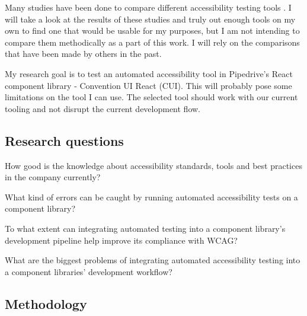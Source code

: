 \documentclass{master_thesis}
\begin{document}
Many studies have been done to compare different accessibility testing tools \citep{Alsaeedi2020, Ismailova2022, Sane2021, Vigo2013, RybinKoob2022, Duran2017}. I will take a look at the results of these studies and truly out enough tools on my own to find one that would be usable for my purposes, but I am not intending to compare them methodically as a part of this work. I will rely on the comparisons that have been made by others in the past.

My research goal is to test an automated accessibility tool in Pipedrive's React component library - Convention UI React (CUI). This will probably pose some limitations on the tool I can use. The selected tool should work with our current tooling and not disrupt the current development flow.

\subsection{Research questions}

	\begin{RQlist}
		\item How good is the knowledge about accessibility standards, tools and best practices in the company currently?
		\item What kind of errors can be caught by running automated accessibility tests on a component library?
		\item To what extent can integrating automated testing into a component library's development pipeline help improve its compliance with WCAG?
		\item What are the biggest problems of integrating automated accessibility testing into a component libraries' development workflow?
	\end{RQlist}

\subsection{Methodology}
\end{document}

